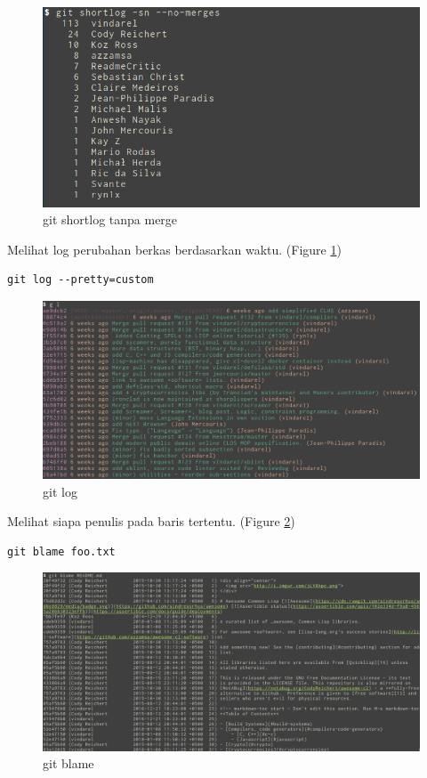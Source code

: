 \documentclass[a4paper,11pt]{article}
\begin{document}
\begin{figure}[tp]
  \centering
  \includegraphics[width=.9\linewidth]{img/fig-1.png}
  \caption{git shortlog tanpa merge}
\end{figure}

\noindent
Melihat log perubahan berkas berdasarkan waktu. (Figure \ref{fig:git-log})

\begin{verbatim}
git log --pretty=custom
\end{verbatim}

\begin{figure}[tp]
  \centering
  \includegraphics[width=.9\linewidth]{img/fig-2.png}
  \caption{git log}
  \label{fig:git-log}
\end{figure}

\noindent
Melihat siapa penulis pada baris tertentu. (Figure \ref{fig:git-blame})

\begin{verbatim}
git blame foo.txt
\end{verbatim}

\begin{figure}[tp]
  \centering
  \includegraphics[width=.9\linewidth]{img/fig-4.png}
  \caption{git blame}
  \label{fig:git-blame}
\end{figure}
\end{document}
